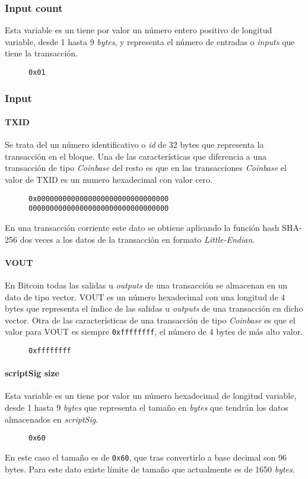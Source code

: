 \documentclass{article}
\begin{document}
    \subsubsection{Input count}
    Esta variable es un tiene por valor un número entero positivo de longitud variable, desde 1 hasta 9 \textit{bytes}, y representa el número de entradas o \textit{inputs} que tiene la transacción.
    \begin{figure}[H]
        \texttt{0x01}
    \end{figure}
    
    \subsubsection{Input}
    
    \paragraph{TXID}
    Se trata del un número identificativo o \textit{id} de 32 bytes que representa la transacción en el bloque. Una de las características que diferencia a una transacción de tipo \textit{Coinbase} del resto es que en las transacciones \textit{Coinbase} el valor de TXID es un numero hexadecimal con valor cero.
    \begin{figure}[H]
        \texttt{0x0000000000000000000000000000000} \\
        \texttt{000000000000000000000000000000000}
    \end{figure}
    En una transacción corriente este dato se obtiene aplicando la función hash SHA-256 dos veces a los datos de la transacción en formato \textit{Little-Endian}.
    
    \paragraph{VOUT}
    En Bitcoin todas las salidas u \textit{outputs} de una transacción se almacenan en un dato de tipo vector. VOUT es un número hexadecimal con una longitud de 4 bytes que representa el índice de las salidas u \textit{outputs} de una transacción en dicho vector. Otra de las características de una transacción de tipo \textit{Coinbase} es que el valor para VOUT es siempre \texttt{0xffffffff}, el número de 4 bytes de más alto valor.
    \begin{figure}[H]
        \texttt{0xffffffff}
    \end{figure}
    
    \paragraph{scriptSig size}
    Esta variable es un tiene por valor un número hexadecimal de longitud variable, desde 1 hasta 9 \textit{bytes} que representa el tamaño en \textit{bytes} que tendrán los datos almacenados en \textit{scriptSig}.
    \begin{figure}[H]
        \texttt{0x60}
    \end{figure}
    En este caso el tamaño es de \texttt{0x60}, que tras convertirlo a base decimal son 96 bytes. Para este dato existe límite de tamaño que actualmente es de 1650 \textit{bytes}.
    
\end{document}
